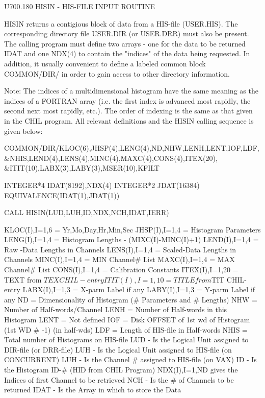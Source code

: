  
   U700.180  HISIN    - HIS-FILE INPUT ROUTINE
 
   HISIN  returns  a  contigious block of data from a HIS-file (USER.HIS). The
   corresponding directory file USER.DIR (or USER.DRR) must also  be  present.
   The  calling  program  must  define  two  arrays  -  one for the data to be
   returned IDAT and one NDX(4) to contain the "indices"  of  the  data  being
   requested.  In  addition,  it usually convenient to define a labeled common
   block COMMON/DIR/ in order to gain access to other directory information.
 
   Note: The indices of a multidimensional histogram have the same meaning  as
   the  indices  of  a  FORTRAN  array  (i.e. the first index is advanced most
   rapidly, the second next most rapidly, etc.). The order of indexing is  the
   same  as  that  given in the CHIL program. All relevant definitions and the
   HISIN calling sequence is given below:
 
         COMMON/DIR/KLOC(6),JHSP(4),LENG(4),ND,NHW,LENH,LENT,IOF,LDF,
        &NHIS,LEND(4),LENS(4),MINC(4),MAXC(4),CONS(4),ITEX(20),
        &ITIT(10),LABX(3),LABY(3),MSER(10),KFILT
 
         INTEGER*4 IDAT(8192),NDX(4)
         INTEGER*2 JDAT(16384)
         EQUIVALENCE(IDAT(1),JDAT(1))
 
         CALL HISIN(LUD,LUH,ID,NDX,NCH,IDAT,IERR)
 
   KLOC(I),I=1,6  = Yr,Mo,Day,Hr,Min,Sec
   JHSP(I),I=1,4  = Histogram Parameters
   LENG(I),I=1,4  = Histogram Lengths - (MIXC(I)-MINC(I)+1)
   LEND(I),I=1,4  = Raw   -Data Lengths in Channels
   LENS(I),I=1,4  = Scaled-Data Lengths in Channels
   MINC(I),I=1,4  = MIN Channel# List
   MAXC(I),I=1,4  = MAX Channel# List
   CONS(I),I=1,4  = Calibration Constants
   ITEX(I),I=1,20 = TEXT  from $TEX CHIL-entry
   ITIT(I),I=1,10 = TITLE from $TIT CHIL-entry
   LABX(I),I=1,3  = X-parm Label if any
   LABY(I),I=1,3  = Y-parm Label if any
   ND   = Dimensionality of Histogram (# Parameters and # Lengths)
   NHW  = Number of Half-words/Channel
   LENH = Number of Half-words in this Histogram
   LENT = Not defined
   IOF  = Disk OFFSET of 1st wd of Histogram (1st WD # -1) (in half-wds)
   LDF  = Length of HIS-file in Half-words
   NHIS = Total number of Histograms on HIS-file
   LUD  - Is the Logical Unit assigned to DIR-file (or DRR-file)
   LUH  - Is the Logical Unit assigned to HIS-file (on CONCURRENT)
   LUH  - Is the Channel #    assigned to HIS-file (on VAX)
   ID   - Is the Histogram ID-# (HID from CHIL Program)
   NDX(I),I=1,ND gives the Indices of first Channel to be retrieved
   NCH  - Is the # of Channels to be returned
   IDAT - Is the Array in which to store the Data
 
